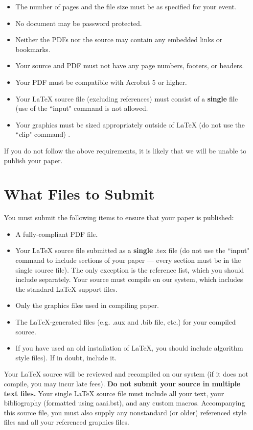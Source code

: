 \documentclass[letterpaper]{article} %
\begin{document}
\begin{itemize}
\item The number of pages and the file size must be as specified for your event.
\item No document may be password protected.
\item Neither the PDFs nor the source may contain any embedded links or bookmarks.
\item Your source and PDF must not have any page numbers, footers, or headers.
\item Your PDF must be compatible with Acrobat 5 or higher.
\item Your \LaTeX{} source file (excluding references) must consist of a \textbf{single} file (use of the ``input" command is not allowed.
\item Your graphics must be sized appropriately outside of \LaTeX{} (do not use the ``clip" command) .
\end{itemize}

If you do not follow the above requirements, it is likely that we will be unable to publish your paper.

\section{What Files to Submit}
You must submit the following items to ensure that your paper is published:
\begin{itemize}
\item A fully-compliant PDF file.
\item Your  \LaTeX{}  source file submitted as a \textbf{single} .tex file (do not use the ``input" command to include sections of your paper --- every section must be in the single source file). The only exception is the reference list, which you should include separately. Your source must compile on our system, which includes the standard \LaTeX{} support files.
\item Only the graphics files used in compiling paper.
\item The \LaTeX{}-generated files (e.g. .aux and .bib file, etc.) for your compiled source.
\item If you have used an old installation of \LaTeX{}, you should include algorithm style files). If in doubt, include it.
\end{itemize}

Your \LaTeX{} source will be reviewed and recompiled on our system (if it does not compile, you may incur late fees).   \textbf{Do not submit your source in multiple text files.} Your single \LaTeX{} source file must include all your text, your bibliography (formatted using aaai.bst), and any custom macros. Accompanying this source file, you must also supply any nonstandard (or older) referenced style files and all your referenced graphics files. 
\end{document}
